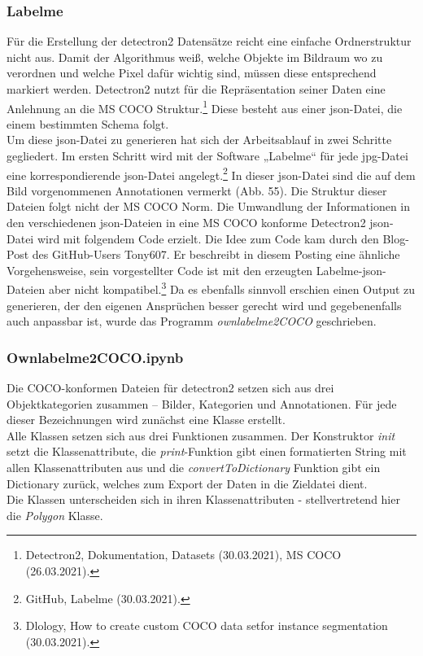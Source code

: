 \documentclass[a4paper,12pt,ngerman]{article}
\begin{document}
\subsubsection{Labelme}
Für die Erstellung der detectron2 Datensätze reicht eine einfache Ordnerstruktur nicht aus. Damit der Algorithmus weiß, welche Objekte im Bildraum wo zu verordnen und welche Pixel dafür wichtig sind, müssen diese entsprechend markiert werden. Detectron2 nutzt für die Repräsentation seiner Daten eine Anlehnung an die MS COCO Struktur.\footnote{Detectron2, Dokumentation, Datasets (30.03.2021), MS COCO (26.03.2021).} Diese besteht aus einer json-Datei, die einem bestimmten Schema folgt. \\
Um diese json-Datei zu generieren hat sich der Arbeitsablauf in zwei Schritte gegliedert. Im ersten Schritt wird mit der Software „Labelme“ für jede jpg-Datei eine korrespondierende json-Datei angelegt.\footnote{GitHub, Labelme (30.03.2021).} In dieser json-Datei sind die auf dem Bild vorgenommenen Annotationen vermerkt (Abb. 55). Die Struktur dieser Dateien folgt nicht der MS COCO Norm. Die Umwandlung der Informationen in den verschiedenen json-Dateien in eine MS COCO konforme Detectron2 json-Datei wird mit folgendem Code erzielt. Die Idee zum Code kam durch den Blog-Post des GitHub-Users Tony607. Er beschreibt in diesem Posting eine ähnliche Vorgehensweise, sein vorgestellter Code ist mit den erzeugten Labelme-json-Dateien aber nicht kompatibel.\footnote{Dlology, How to create custom COCO data setfor instance segmentation (30.03.2021).}  Da es ebenfalls sinnvoll erschien einen Output zu generieren, der den eigenen Ansprüchen besser gerecht wird und gegebenenfalls auch anpassbar ist, wurde das Programm \textit{ownlabelme2COCO} geschrieben. \\

\subsubsection*{Ownlabelme2COCO.ipynb}

Die COCO-konformen Dateien für detectron2 setzen sich aus drei Objektkategorien zusammen – Bilder, Kategorien und Annotationen. Für jede dieser Bezeichnungen wird zunächst eine Klasse erstellt. \\
Alle Klassen setzen sich aus drei Funktionen zusammen. Der Konstruktor \textit{init} setzt die Klassenattribute, die \textit{print}-Funktion gibt einen formatierten String mit allen Klassenattributen aus und die \textit{convertToDictionary} Funktion gibt ein Dictionary zurück, welches zum Export der Daten in die Zieldatei dient. \\
Die Klassen unterscheiden sich in ihren Klassenattributen - stellvertretend hier die \textit{Polygon} Klasse. \\
\end{document}
